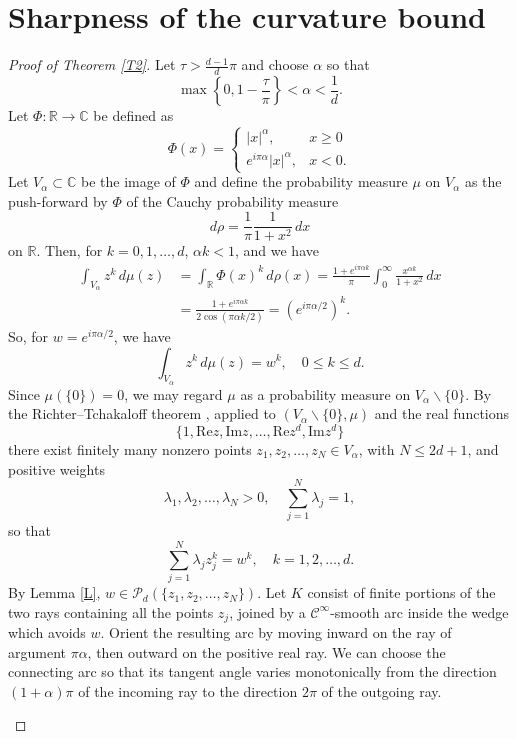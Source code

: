 \documentclass[10pt,a4paper]{amsart}
\newcommand{\C}{\mathbb{C}}
\newcommand{\R}{\mathbb{R}}
\newcommand{\cC}{\mathcal{C}}
\newcommand{\cP}{\mathcal{P}}
\newcommand\Real{\mathrm{Re}}
\newcommand\Imag{\mathrm{Im}}
\numberwithin{equation}{section}
\begin{document}
\section{Sharpness of the curvature bound}

\begin{proof}[Proof of Theorem \ref{T2}] Let $\tau>\frac{d-1}{d}\pi$ and choose $\alpha$ so that
\[\max\left\{0,1-\frac{\tau}{\pi}\right\}<\alpha<\frac1d.\]
Let $\Phi:\R\to \C$ be defined as 
\[
\Phi(x)=\begin{cases}
    |x|^\alpha ,&x\ge 0 \\
    e^{i\pi\alpha}|x|^\alpha ,& x < 0.
\end{cases}
\]
Let $V_{\alpha}\subset\C$ be the image of $\Phi$ and  	
define the probability measure $\mu$ on $V_{\alpha}$ as the push-forward by $\Phi$ of the Cauchy probability measure 
\[d\rho=\frac{1}{\pi}\frac{1}{1+x^2}\,dx\]
on $\R$. Then, for $k=0,1,\ldots, d$, $\alpha k<1$, and we have 
\begin{align*} \int_{V_\alpha}z^k\,d\mu (z)&=\int_{\R}\Phi(x)^k\,d\rho(x)=\frac{1+e^{i\pi\alpha k}}{\pi}\int_0^\infty \frac{x^{\alpha k}}{1+x^2}\,dx\\
    &=\frac{1+e^{i\pi \alpha k}}{2\cos(\pi\alpha k/2)}=(e^{i\pi\alpha/2})^k.
\end{align*}
So, for $w=e^{i\pi\alpha/2}$, we have
\[\int_{V_\alpha}z^k\,d\mu (z)=w^k,\quad 0\le k\le d.\]
Since $\mu(\{0\})=0$, we may regard $\mu$ as a probability measure on $V_\alpha\backslash\{0\}$. By the Richter--Tchakaloff theorem \cite{R,T}, applied to $(V_{\alpha}\backslash\{0\},\mu)$ and the real functions 
\[\{1,\Real z,\Imag z,\ldots,\Real z^d,\Imag z^d\}\]
there exist finitely many nonzero points $z_1,z_2,\ldots,z_N\in V_{\alpha}$, with $N\le 2d+1$, and positive weights \[\lambda_1,\lambda_2,\ldots,\lambda_N>0,\quad \sum_{j=1}^{N}\lambda_j=1,\]
so that 
\[\sum_{j=1}^N\lambda_jz_j^k=w^k,\quad k=1,2,\ldots,d.\] 
By Lemma \ref{L}, $w\in\cP_d (\{z_1,z_2,\ldots,z_N\})$.
Let $K$ consist of finite portions of the two rays containing all the points $z_j$, joined by a $\cC^{\infty}$-smooth arc inside the wedge which avoids $w$. Orient the resulting arc by moving inward on the ray of argument $\pi\alpha$, then outward on the positive real ray. We can choose the connecting arc so that its tangent angle varies monotonically from the direction $(1+\alpha)\pi$ of the incoming ray to the direction $2\pi$ of the outgoing ray. 

\begin{figure}[H]
\begin{center}\begin{tikzpicture}[
    scale=0.6,
    every node/.style={font=\small},
    point/.style={circle,fill=black,inner sep=2pt},
    contour/.style={line width=1.3pt},
]


\end{tikzpicture}
\end{center}
\end{figure}
\end{proof}
\end{document}
